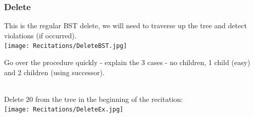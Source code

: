 \subsubsection{Delete}
This is the regular BST delete, we will need to traverse up the
tree and detect violations (if occurred).\\
\texttt{[image: Recitations/DeleteBST.jpg]}\\
\begin{remark} Go over the procedure quickly - explain the 3 cases - no
children, 1 child (easy) and 2 children (using successor).
\end{remark}
\begin{example}\\
    Delete $20$ from the tree in the beginning of the recitation:\\
    \texttt{[image: Recitations/DeleteEx.jpg]}
\end{example}
%
%
%
